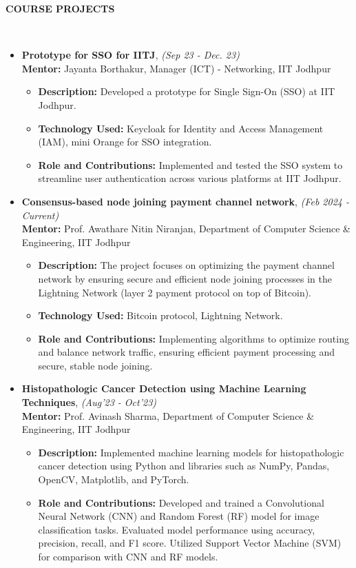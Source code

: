 \documentclass[a4paper,10pt]{article}
\newcommand{\resheading}[1]{{\small \colorbox{mygrey}{\begin{minipage}{0.99\textwidth}{\textbf{#1 \vphantom{p^{E}}}}\end{minipage}}}}
\begin{document}
\noindent
\resheading{\textbf{COURSE PROJECTS} }\\[-0.3cm]
\begin{itemize}[noitemsep,nolistsep]
\item \textbf{Prototype for SSO for IITJ}, \emph{(Sep 23 - Dec. 23)}\hfill \\
\textbf{Mentor:} {Jayanta Borthakur, Manager (ICT) - Networking, IIT Jodhpur}
\begin{itemize}[noitemsep,nolistsep]
    \item \textbf{Description:} Developed a prototype for Single Sign-On (SSO) at IIT Jodhpur.
    \item \textbf{Technology Used:} Keycloak for Identity and Access Management (IAM), mini Orange for SSO integration.
    \item \textbf{Role and Contributions:} Implemented and tested the SSO system to streamline user authentication across various platforms at IIT Jodhpur.
\end{itemize}

\item \textbf{Consensus-based node joining payment channel network}, \emph{(Feb 2024 - Current)}\hfill \\
\textbf{Mentor:} {Prof. Awathare Nitin Niranjan, Department of Computer Science \& Engineering, IIT Jodhpur}
\begin{itemize}[noitemsep,nolistsep]
    \item \textbf{Description:} The project focuses on optimizing the payment channel network by ensuring secure and efficient node joining processes in the Lightning Network (layer 2 payment protocol on top of Bitcoin).
    \item \textbf{Technology Used:} Bitcoin protocol, Lightning Network.
    \item \textbf{Role and Contributions:} Implementing algorithms to optimize routing and balance network traffic, ensuring efficient payment processing and secure, stable node joining.
\end{itemize}

\item \textbf{Histopathologic Cancer Detection using Machine Learning Techniques}, \emph{(Aug'23 - Oct'23)}\hfill \\
\textbf{Mentor:} {Prof. Avinash Sharma, Department of Computer Science \& Engineering, IIT Jodhpur}
\begin{itemize}[noitemsep,nolistsep]
    \item \textbf{Description:} Implemented machine learning models for histopathologic cancer detection using Python and libraries such as NumPy, Pandas, OpenCV, Matplotlib, and PyTorch.
    \item \textbf{Role and Contributions:} Developed and trained a Convolutional Neural Network (CNN) and Random Forest (RF) model for image classification tasks. Evaluated model performance using accuracy, precision, recall, and F1 score. Utilized Support Vector Machine (SVM) for comparison with CNN and RF models.
\end{itemize}


\end{itemize}
\end{document}
